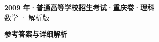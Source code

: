 \documentclass[zihao=-4, a4paper]{ctexart}
\begin{document}
\begin{center}
  {\Large\bfseries 2009 年·普通高等学校招生考试·重庆卷·理科}\\[4pt]
  {\large 数学 · 解析版}
\end{center}
\medskip
{}

\clearpage
{}
\begin{center}{\Large\bfseries 参考答案与详细解析}\end{center}
\medskip

\end{document}
